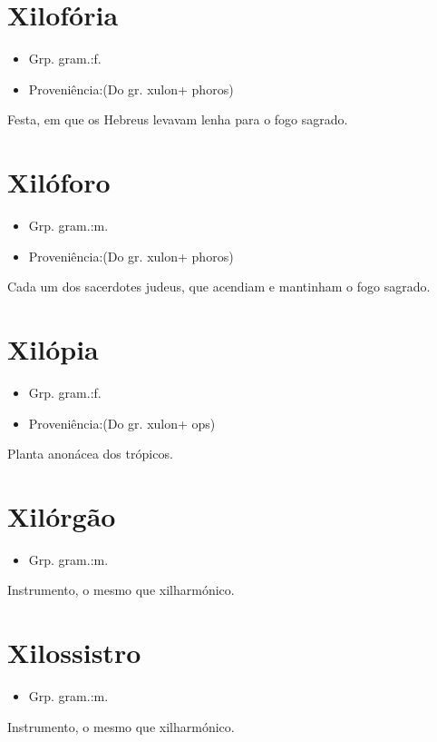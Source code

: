 \section{Xilofória}
\begin{itemize}
\item {Grp. gram.:f.}
\end{itemize}
\begin{itemize}
\item {Proveniência:(Do gr. \textunderscore xulon\textunderscore  + \textunderscore phoros\textunderscore )}
\end{itemize}
Festa, em que os Hebreus levavam lenha para o fogo sagrado.
\section{Xilóforo}
\begin{itemize}
\item {Grp. gram.:m.}
\end{itemize}
\begin{itemize}
\item {Proveniência:(Do gr. \textunderscore xulon\textunderscore  + \textunderscore phoros\textunderscore )}
\end{itemize}
Cada um dos sacerdotes judeus, que acendiam e mantinham o fogo sagrado.
\section{Xilópia}
\begin{itemize}
\item {Grp. gram.:f.}
\end{itemize}
\begin{itemize}
\item {Proveniência:(Do gr. \textunderscore xulon\textunderscore  + \textunderscore ops\textunderscore )}
\end{itemize}
Planta anonácea dos trópicos.
\section{Xilórgão}
\begin{itemize}
\item {Grp. gram.:m.}
\end{itemize}
Instrumento, o mesmo que \textunderscore xilharmónico\textunderscore .
\section{Xilossistro}
\begin{itemize}
\item {Grp. gram.:m.}
\end{itemize}
Instrumento, o mesmo que \textunderscore xilharmónico\textunderscore .
